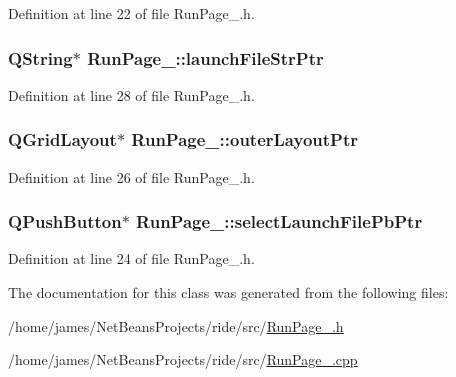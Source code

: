 Definition at line 22 of file Run\-Page\-\_.\-h.

\hypertarget{class_run_page__2_a2f0a31e8ef388e15091c88a904d77618}{
\subsubsection[{launch\-File\-Str\-Ptr}]{\setlength{\rightskip}{0pt plus 5cm}Q\-String$\ast$ Run\-Page\-\_\-::launch\-File\-Str\-Ptr\hspace{0.3cm}{\ttfamily [private]}}}\label{class_run_page__2_a2f0a31e8ef388e15091c88a904d77618}


Definition at line 28 of file Run\-Page\-\_.\-h.

\hypertarget{class_run_page__2_a0f6d8544357260968d9244cd6f927656}{
\subsubsection[{outer\-Layout\-Ptr}]{\setlength{\rightskip}{0pt plus 5cm}Q\-Grid\-Layout$\ast$ Run\-Page\-\_\-::outer\-Layout\-Ptr\hspace{0.3cm}{\ttfamily [private]}}}\label{class_run_page__2_a0f6d8544357260968d9244cd6f927656}


Definition at line 26 of file Run\-Page\-\_.\-h.

\hypertarget{class_run_page__2_a63aea1b3e5cb510e54893adc80bd4852}{
\subsubsection[{select\-Launch\-File\-Pb\-Ptr}]{\setlength{\rightskip}{0pt plus 5cm}Q\-Push\-Button$\ast$ Run\-Page\-\_\-::select\-Launch\-File\-Pb\-Ptr\hspace{0.3cm}{\ttfamily [private]}}}\label{class_run_page__2_a63aea1b3e5cb510e54893adc80bd4852}


Definition at line 24 of file Run\-Page\-\_.\-h.



The documentation for this class was generated from the following files\-:\begin{DoxyCompactItemize}
\item 
/home/james/\-Net\-Beans\-Projects/ride/src/\hyperlink{_run_page__2_8h}{Run\-Page\-\_.\-h}\item 
/home/james/\-Net\-Beans\-Projects/ride/src/\hyperlink{_run_page__2_8cpp}{Run\-Page\-\_.\-cpp}\end{DoxyCompactItemize}
